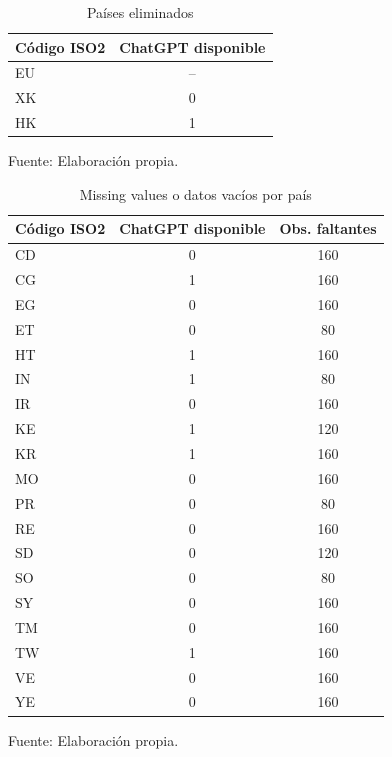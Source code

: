\documentclass[12pt,a4paper]{article}
\begin{document}
\begin{table}[H]
\centering
\caption{Países eliminados}
\label{tab:anexo_paises}
\begin{tabular}{lc}
\toprule
Código ISO2 & ChatGPT disponible \\
\midrule
EU & -- \\
XK & 0 \\
HK & 1 \\
\bottomrule
\end{tabular}
\begin{minipage}{\linewidth}\smallskip\footnotesize Fuente: Elaboración propia.\end{minipage}
\end{table}


\begin{table}[H]
\centering
\caption{Missing values o datos vacíos por país}
\label{tab:anexo_missing}
\begin{tabular}{lcc}
\toprule
Código ISO2 & ChatGPT disponible & Obs. faltantes \\
\midrule
CD & 0 & 160 \\
CG & 1 & 160 \\
EG & 0 & 160 \\
ET & 0 & 80 \\
HT & 1 & 160 \\
IN & 1 & 80 \\
IR & 0 & 160 \\
KE & 1 & 120 \\
KR & 1 & 160 \\
MO & 0 & 160 \\
PR & 0 & 80 \\
RE & 0 & 160 \\
SD & 0 & 120 \\
SO & 0 & 80 \\
SY & 0 & 160 \\
TM & 0 & 160 \\
TW & 1 & 160 \\
VE & 0 & 160 \\
YE & 0 & 160 \\
\bottomrule
\end{tabular}
\begin{minipage}{\linewidth}\smallskip\footnotesize Fuente: Elaboración propia.\end{minipage}
\end{table}



\end{document}
